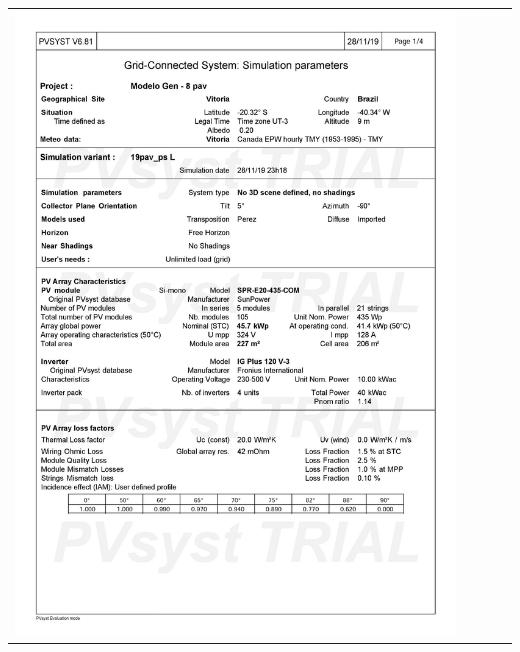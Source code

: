 \begin{table}[H]
    \centering
    \begin{tabular}{l}
        \includegraphics[width=0.9\textwidth]{figures/attachments/resultpv29.jpg}
    \end{tabular}
\end{table}
\pagebreak
